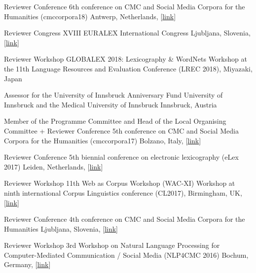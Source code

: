         {Reviewer}
        {Conference}
        {6th conference on CMC and Social Media Corpora for the Humanities (cmccorpora18)}
        {Antwerp, Netherlands,
         [\href{https://www.uantwerpen.be/en/conferences/cmc-social-media-2018/}{link}]}
        {}

        {Reviewer}
        {Congress}
        {XVIII EURALEX International Congress}
        {Ljubljana, Slovenia, [\href{https://euralex2018.cjvt.si/}{link}]}
        {}

        {Reviewer}
        {Workshop}
        {GLOBALEX 2018: Lexicography \& WordNets}
        {Workshop at the 11th Language Resources and Evaluation Conference
         (LREC 2018), Miyazaki, Japan}
        {}

        {Assessor for the University of Innsbruck}
        {Anniversary Fund}
        {University of Innsbruck and the Medical University of Innsbruck}
        {Innsbruck, Austria}
        {}

        {Member of the Programme Committee and Head of the Local Organising Committee + Reviewer}
        {Conference}
        {5th conference on CMC and Social Media Corpora for the Humanities
         (cmccorpora17)}
        {Bolzano, Italy, [\href{https://cmc-corpora2017.eurac.edu}{link}]}
        {}

        {Reviewer}
        {Conference}
        {5th biennial conference on electronic lexicography (eLex 2017)}
        {Leiden, Netherlands, [\href{https://elex.link/elex2017/}{link}]}
        {}

        {Reviewer}
        {Workshop}
        {11th Web as Corpus Workshop (WAC-XI)}
        {Workshop at ninth international Corpus Linguistics conference
         (CL2017), Birmingham, UK,
         [\href{https://www.sigwac.org.uk/wiki/WAC-XI}{link}]}
        {}


        {Reviewer}
        {Conference}
        {4th conference on CMC and Social Media Corpora for the Humanities}
        {Ljubljana, Slovenia, [\href{http://nl.ijs.si/janes/cmc-corpora2016/}{link}]}
        {}

        {Reviewer}
        {Workshop}
        {3rd Workshop on Natural Language Processing for Computer-Mediated Communication /
        Social Media (NLP4CMC 2016)}
        {Bochum, Germany, [\href{https://sites.google.com/site/nlp4cmc2016/}{link}]}
        {}

